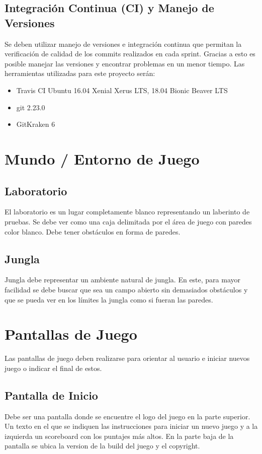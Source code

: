 \documentclass[letterpaper]{scrreprt}
\begin{document}
\section{Integración Continua (CI) y Manejo de Versiones}
Se deben utilizar manejo de versiones e integración continua que permitan la verificación de calidad de los commits realizados en cada sprint. Gracias a esto es posible manejar las versiones y encontrar problemas en un menor tiempo.
Las herramientas utilizadas para este proyecto serán: 
\begin{itemize}
	 \item Travis CI Ubuntu 16.04 Xenial Xerus LTS, 18.04 Bionic Beaver LTS
	 \item git 2.23.0
	 \item GitKraken 6
\end{itemize}
\chapter{Mundo / Entorno de Juego}

\section{Laboratorio}
El laboratorio es un lugar completamente blanco representando un laberinto de pruebas. Se debe ver como una caja delimitada por el área de juego con paredes color blanco. Debe tener obstáculos en forma de paredes.

\section{Jungla}
Jungla debe representar un ambiente natural de jungla. En este, para mayor facilidad se debe buscar que sea un campo abierto sin demasiados obstáculos y que se pueda ver en los límites la jungla como si fueran las paredes.

\chapter{Pantallas de Juego}
Las pantallas de juego deben realizarse para orientar al usuario e iniciar nuevos juego o indicar el final de estos.

\section{Pantalla de Inicio}
Debe ser una pantalla donde se encuentre el logo del juego en la parte superior. Un texto en el que se indiquen las instrucciones para iniciar un nuevo juego y a la izquierda un scoreboard con los puntajes más altos. En la parte baja de la pantalla se ubica la version de la build del juego y el copyright.
\end{document}

